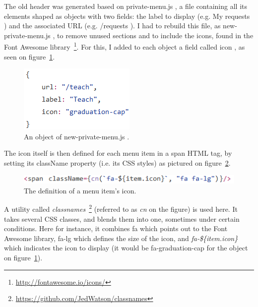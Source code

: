 The old header was generated based on \guillemotleft{} private-menu.js \guillemotright{}, a file containing all its elements shaped as objects with two fields: the label to display (e.g. \guillemotleft{} My requests \guillemotright{}) and the associated URL (e.g. \guillemotleft{} /requests \guillemotright{}). I had to rebuild this file, as \guillemotleft{} new-private-menu.js \guillemotright{}, to remove unused sections and to include the icons, found in the Font Awesome library~\footnote{\url{http://fontawesome.io/icons/}}. For this, I added to each object a field called \guillemotleft{} icon \guillemotright{}, as seen on {\sc figure}~\ref{fig:icon}.

\begin{figure}[H]
    \centering
    \includegraphics{figure/icon.png}
    \caption{An object of \guillemotleft{} new-private-menu.js \guillemotright{}.}
    \label{fig:icon}
\end{figure}

The icon itself is then defined for each menu item in a span HTML tag, by setting its className property (i.e. its CSS styles) as pictured on {\sc figure}~\ref{fig:classnames}.

\begin{figure}[H]
    \centering
    \includegraphics{figure/classnames.png}
    \caption{The definition of a menu item's icon.}
    \label{fig:classnames}
\end{figure}

A utility called \textit{classnames}~\footnote{\url{https://github.com/JedWatson/classnames}} (referred to as \textit{cn} on the figure) is used here. It takes several CSS classes, and blends them into one, sometimes under certain conditions. Here for instance, it combines \guillemotleft{} fa \guillemotright{} which points out to the Font Awesome library, \guillemotleft{} fa-lg \guillemotright{} which defines the size of the icon, and \textit{fa-\$\{item.icon\}} which indicates the icon to display (it would be \guillemotleft{} fa-graduation-cap \guillemotright{} for the object on {\sc figure}~\ref{fig:icon}).

